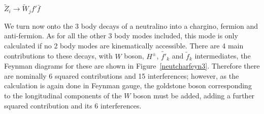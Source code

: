 \documentclass[final,3p,times]{elsarticle}
\begin{document}
\textbf{\underline{$\tilde{Z}_i \rightarrow \tilde{W}_j f' \bar{f}$}}

We turn now onto the 3 body decays of a neutralino into a chargino, fermion and anti-fermion. As for all the other 3 body modes included, this mode is only calculated if no 2 body modes are kinematically accessible. 
There are 4 main contributions to these decays, with $W$ boson, $H^{\pm}$, $\tilde{f'}_k$ and $\tilde{f}_k$ intermediates, the Feynman diagrams for these are shown in Figure~\ref{neutcharfeyn3}. Therefore there are nominally 6 squared contributions and 15 interferences; however, as the calculation is again done in Feynman gauge, the goldstone boson corresponding to the longitudinal components of the $W$ boson must be added, adding a further squared contribution and its 6 interferences.
\begin{figure}
    \: \: \: \:

\end{figure}
\end{document}
